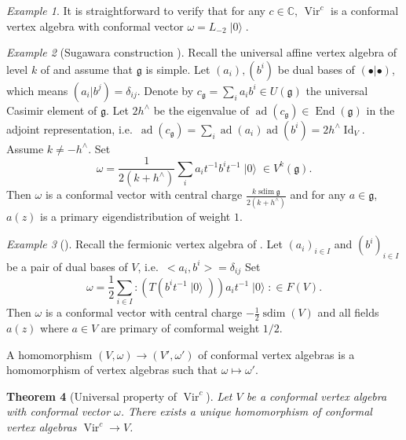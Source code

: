 \documentclass[a4paper, 12pt, reqno]{amsart}
\newtheorem{theorem}{Theorem}[section]
\theoremstyle{remark}
\newtheorem{example}[theorem]{Example}
\numberwithin{equation}{subsection}
\DeclareMathOperator{\Vir}{Vir}
\DeclareMathOperator{\Id}{Id}
\DeclareMathOperator{\End}{End}
\DeclareMathOperator{\vac}{|0\rangle}
\DeclareMathOperator{\ad}{ad}
\DeclareMathOperator{\sdim}{sdim}
\begin{document}
\begin{example}
  \label{exa:8}
  It is straightforward to verify that for any $c \in \mathbb{C}$, $\Vir^c$ is a conformal vertex algebra with conformal vector $\omega = L_{-2}\vac$.
\end{example}

\begin{example}[Sugawara construction {\cite[Theorem 5.7]{kac_vertex_1998}}]
  \label{exa:9}
  Recall the universal affine vertex algebra of level $k$ of  and assume that $\mathfrak{g}$ is simple.
  Let $(a_i), (b^i)$ be dual bases of $(\bullet| \bullet)$, which means $(a_i| b^j) = \delta_{ij}$.
  Denote by $c_{\mathfrak{g}} = \sum_ia_ib^i \in U(\mathfrak{g})$ the universal Casimir element of $\mathfrak{g}$.
  Let $2h^{\wedge}$ be the eigenvalue of $\ad(c_{\mathfrak{g}}) \in \End(\mathfrak{g})$ in the adjoint representation, i.e.\ $\ad(c_{\mathfrak{g}}) = \sum_i\ad(a_i)\ad(b^i) = 2h^{\wedge}\Id_V$. 
  Assume $k \neq -h^\wedge$.
  Set
  \begin{equation*}
    \omega = \frac{1}{2(k + h^\wedge)}\sum_ia_it^{-1}b^it^{-1}\vac \in V^k(\mathfrak{g}).
  \end{equation*}
  Then $\omega$ is a conformal vector with central charge $\frac{k \sdim\mathfrak{g}}{2(k + h^\wedge)}$ and for any $a \in \mathfrak{g}$, $a(z)$ is a primary eigendistribution of weight $1$.
\end{example}

\begin{example}[{\cite[Proposition 4.10]{kac_vertex_1998}}]
  \label{exa:10}
  Recall the fermionic vertex algebra of .
  Let $(a_i)_{i \in I}$ and $(b^i)_{i \in I}$ be a pair of dual bases of $V$, i.e.\ $<a_i, b^i> = \delta_{ij}$
  Set
  \begin{equation*}
    \omega = \frac{1}{2}\sum_{i \in I}:(T(b^it^{-1}\vac))a_it^{-1}\vac: \in F(V).
  \end{equation*}
  Then $\omega$ is a conformal vector with central charge $-\frac{1}{2}\sdim(V)$ and all fields $a(z)$ where $a \in V$ are primary of comformal weight $1/2$.
\end{example}

A homomorphism $(V, \omega) \to (V', \omega')$ of conformal vertex algebras is a homomorphism of vertex algebras such that $\omega \mapsto \omega'$.

\begin{theorem}[Universal property of $\Vir^c$]
  \label{thr:24}
  Let $V$ be a conformal vertex algebra with conformal vector $\omega$.
  There exists a unique homomorphism of conformal vertex algebras $\Vir^c \to V$.
\end{theorem}
\end{document}
